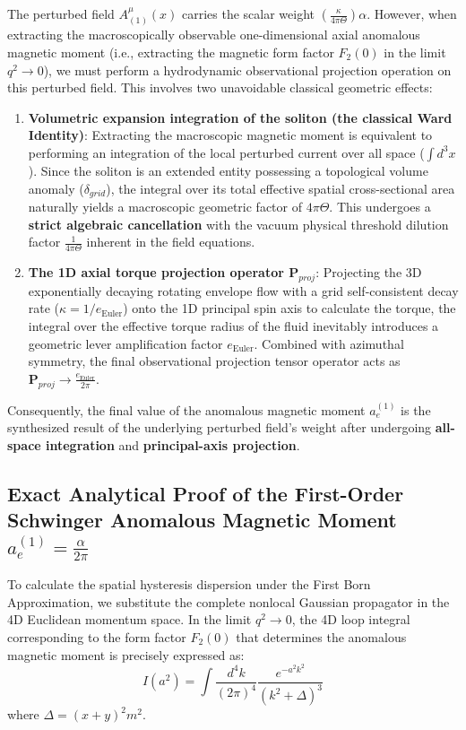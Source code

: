 \documentclass[12pt, a4paper]{article}
\begin{document}
The perturbed field $A_{(1)}^\mu(x)$ carries the scalar weight $\left(\frac{\kappa}{4\pi\Theta}\right)\alpha$. However, when extracting the macroscopically observable one-dimensional axial anomalous magnetic moment (i.e., extracting the magnetic form factor $F_2(0)$ in the limit $q^2 \to 0$), we must perform a hydrodynamic observational projection operation on this perturbed field. This involves two unavoidable classical geometric effects:
\begin{enumerate}
    \item \textbf{Volumetric expansion integration of the soliton (the classical Ward Identity)}: Extracting the macroscopic magnetic moment is equivalent to performing an integration of the local perturbed current over all space ($\int d^3x$). Since the soliton is an extended entity possessing a topological volume anomaly ($\delta_{grid}$), the integral over its total effective spatial cross-sectional area naturally yields a macroscopic geometric factor of $4\pi\Theta$. This undergoes a \textbf{strict algebraic cancellation} with the vacuum physical threshold dilution factor $\frac{1}{4\pi\Theta}$ inherent in the field equations.
    
    \item \textbf{The 1D axial torque projection operator $\mathbf{P}_{proj}$}: Projecting the 3D exponentially decaying rotating envelope flow with a grid self-consistent decay rate ($\kappa = 1/e_{\text{Euler}}$) onto the 1D principal spin axis to calculate the torque, the integral over the effective torque radius of the fluid inevitably introduces a geometric lever amplification factor $e_{\text{Euler}}$. Combined with azimuthal symmetry, the final observational projection tensor operator acts as $\mathbf{P}_{proj} \to \frac{e_{\text{Euler}}}{2\pi}$.
\end{enumerate}
Consequently, the final value of the anomalous magnetic moment $a_e^{(1)}$ is the synthesized result of the underlying perturbed field's weight after undergoing \textbf{all-space integration} and \textbf{principal-axis projection}.

\subsection{Exact Analytical Proof of the First-Order Schwinger Anomalous Magnetic Moment $a_e^{(1)} = \frac{\alpha}{2\pi}$}

To calculate the spatial hysteresis dispersion under the First Born Approximation, we substitute the complete nonlocal Gaussian propagator in the 4D Euclidean momentum space. In the limit $q^2 \to 0$, the 4D loop integral corresponding to the form factor $F_2(0)$ that determines the anomalous magnetic moment is precisely expressed as:
\begin{equation}
I(a^2) = \int \frac{d^4k}{(2\pi)^4} \frac{e^{-a^2 k^2}}{\left(k^2 + \Delta\right)^3}
\end{equation}
where $\Delta = (x+y)^2 m^2$.
\end{document}
